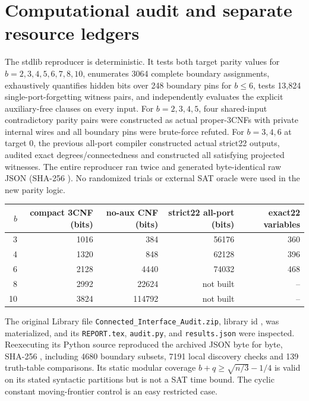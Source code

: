 \documentclass[11pt]{article}
\begin{document}
\section{Computational audit and separate resource ledgers}
The stdlib reproducer  is deterministic. It tests both target parity values for $b=2,3,4,5,6,7,8,10$, enumerates 3064 complete boundary assignments, exhaustively quantifies hidden bits over 248 boundary pins for $b\le6$, tests 13,824 single-port-forgetting witness pairs, and independently evaluates the explicit auxiliary-free clauses on every input. For $b=2,3,4,5$, four shared-input contradictory parity pairs were constructed as actual proper-3CNFs with private internal wires and all boundary pins were brute-force refuted. For $b=3,4,6$ at target 0, the previous all-port compiler constructed actual strict22 outputs, audited exact degrees/connectedness and constructed all satisfying projected witnesses. The entire reproducer ran twice and generated byte-identical raw JSON (SHA-256 ). No randomized trials or external SAT oracle were used in the new parity logic.

\begin{center}
\begin{tabular}{rrrrr}
\toprule
$b$ & compact 3CNF (bits) & no-aux CNF (bits) & strict22 all-port (bits) & exact22 variables \\
\midrule
3 & 1016 & 384 & 56176 & 360 \\
4 & 1320 & 848 & 62128 & 396 \\
6 & 2128 & 4440 & 74032 & 468 \\
8 & 2992 & 22624 & not built & -- \\
10 & 3824 & 114792 & not built & -- \\
\bottomrule
\end{tabular}
\end{center}

The original Library file \texttt{Connected\_Interface\_Audit.zip}, library id , was materialized, and its \texttt{REPORT.tex}, \texttt{audit.py}, and \texttt{results.json} were inspected. Reexecuting its Python source reproduced the archived JSON byte for byte, SHA-256 , including 4680 boundary subsets, 7191 local discovery checks and 139 truth-table comparisons. Its static modular coverage $b+q\ge\sqrt{n/3}-1/4$ is valid on its stated syntactic partitions but is not a SAT time bound. The cyclic constant moving-frontier control is an easy restricted case.
\end{document}
